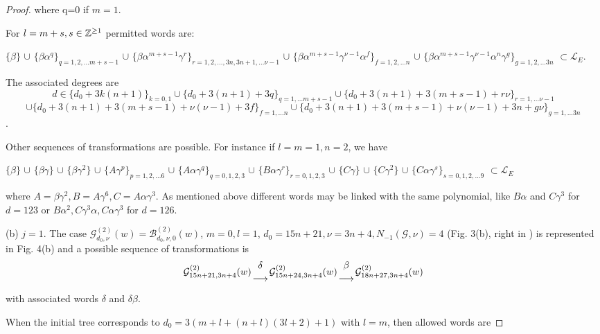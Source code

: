 \documentclass{birkjour_t2}
\theoremstyle{definition}
\theoremstyle{remark}
\numberwithin{equation}{section}
\begin{document}
\begin{proof}
\par\noindent      
 where  q=0 if $m=1$. 
\par
For $l=m+s, s \in {\Bbb{Z}}^{\geq 1}$  permitted words  are: 
       \bigskip\par     
        $\{\beta\}$ $\cup$ $\{\beta\alpha^q\}_{q=1, 2, \dots m+s-1}$ $\cup$ $\{\beta\alpha^{m+s-1}\gamma^r\}_{r=1, 2, \dots , 3n, 3n+1, \dots  \nu-1}$ $\cup$  $\{\beta\alpha^{m+s-1}\gamma^{\nu-1}\alpha^f\}_{f=1, 2, \dots  n}$  $\cup$  $\{\beta\alpha^{m+s-1}\gamma^{\nu-1}\alpha^n\gamma^g\}_{g=1, 2, \dots  3n}$ $\subset \mathcal{L}_{E}$. 
\par
The associated degrees are   
$$d \in \{d_{0}+3k(n+1)\}_{k=0,1}\cup\{d_{0}+3(n+1)+3q\}_{q=1,\dots m+s-1}\cup\{d_{0}+3(n+1)+3(m+s-1)+r\nu\}_{r=1, \dots \nu-1}$$
$$\cup\{d_{0}+3(n+1)+3(m+s-1)+\nu(\nu-1)+3f\}_{f=1, \dots n}\cup\{d_{0}+3(n+1)+3(m+s-1)+\nu(\nu-1)+3n+g\nu\}_{g=1, \dots 3n}$$.
\par
Other sequences of transformations are possible. For instance if $l=m=1, n=2$, we have  
       \bigskip\par          
  $\{\beta\}$ $\cup$  $\{\beta\gamma\}$ $\cup$  $\{\beta\gamma^2\}$ $\cup$ $\{A\gamma^p\}_{p=1, 2, ... 6}$ $\cup$   $\{A\alpha\gamma^q\}_{q=0, 1, 2, 3}$ $\cup$  $\{B\alpha\gamma^r\}_{r=0, 1, 2, 3}$ $\cup$  $\{C\gamma\}$ $\cup$  $\{C\gamma^2\}$ $\cup$  $\{C\alpha\gamma^s \}_{s=0, 1, 2, \dots 9}$ $\subset \mathcal{L}_{E}$
\par\noindent    
  where $A=\beta\gamma^2, B=A\gamma^6, C=A\alpha\gamma^3$. As mentioned above different words may be linked with the same polynomial, like $B\alpha$ and $C\gamma^3$ for $d=123$ or $B\alpha^2, C\gamma^3\alpha, C\alpha\gamma^3$ for $d=126$.          
     \bigskip\par
(b) $j=1$. The case ${\mathcal{G}}^{(2)}_{d_{0}, \nu}(w)={\mathcal{B}}^{(2)}_{d_{0}, \nu, 0}(w)$, $m=0, l=1$, $d_{0}=15n+21, \nu=3n+4,  N_{-1}(\mathcal{G}, \nu)=4$ (Fig. 3(b), right in \cite{esc26}) is represented in Fig. 4(b) and a possible sequence of transformations is
         \begin{equation} 
{\mathcal{G}}^{(2)}_{15n+21, 3n+4}(w){ \delta \atop \longrightarrow } {\mathcal{G}}^{(2)}_{15n+24,3n+4}(w)   { \beta \atop \longrightarrow } {\mathcal{G}}^{(2)}_{18n+27,3n+4}(w)
    \end{equation} 
\par\noindent
with associated words $\delta$ and $\delta\beta$. 
\par
When the initial tree corresponds to $d_{0}= 3(m+l+(n+l)(3l+2)+1)$ with $l=m$, then allowed words are  

\end{proof}
\end{document}
